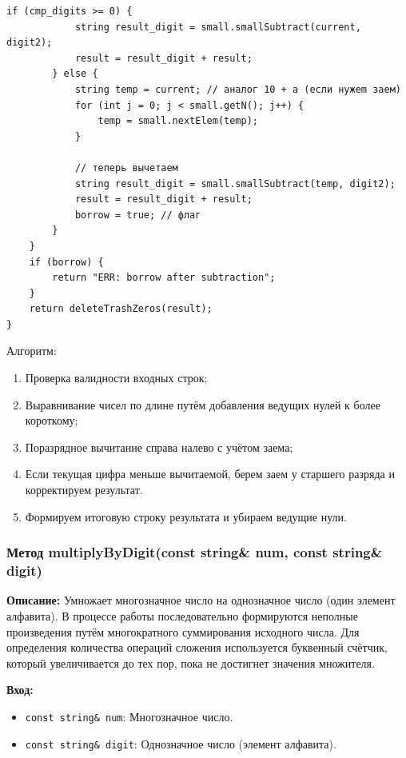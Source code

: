 \begin{lstlisting}[style=cstyle, caption={Реализация subtractBigUnsigned()}]
        if (cmp_digits >= 0) {
            string result_digit = small.smallSubtract(current, digit2);
            result = result_digit + result;
        } else {
            string temp = current; // аналог 10 + a (если нужem заем)
            for (int j = 0; j < small.getN(); j++) {
                temp = small.nextElem(temp);
            }

            // теперь вычетаем
            string result_digit = small.smallSubtract(temp, digit2);
            result = result_digit + result;
            borrow = true; // флаг
        }
    }
    if (borrow) {
        return "ERR: borrow after subtraction";
    }
    return deleteTrashZeros(result);
}
\end{lstlisting}

Алгоритм:
\begin{enumerate}
\item Проверка валидности входных строк;
\item Выравнивание чисел по длине путём добавления ведущих нулей к более короткому;

\item Поразрядное вычитание справа налево с учётом заема;

\item Если текущая цифра меньше вычитаемой, берем заем у старшего разряда и корректируем результат.

\item Формируем итоговую строку результата и убираем ведущие нули.
\end{enumerate}

\subsubsection{Метод multiplyByDigit(const string\& num, const string\& digit)}

\textbf{Описание:} Умножает многозначное число на однозначное число (один элемент алфавита). В процессе работы последовательно формируются неполные произведения путём многократного суммирования исходного числа. Для определения количества операций сложения используется буквенный счётчик, который увеличивается до тех пор, пока не достигнет значения множителя.

\textbf{Вход:}
\begin{itemize}
    \item \texttt{const string\& num}: Многозначное число.
    \item \texttt{const string\& digit}:  Однозначное число (элемент алфавита).
\end{itemize}

